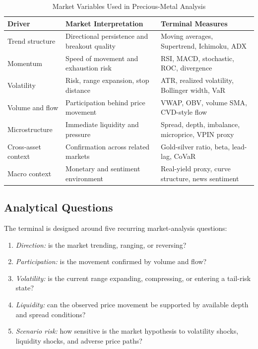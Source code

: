 \documentclass[conference]{IEEEtran}
\begin{document}
\begin{table}[!t]
\caption{Market Variables Used in Precious-Metal Analysis}
\label{tab:market-drivers}
\centering
\begin{tabular}{@{}p{}p{}p{}@{}}
\toprule
\textbf{Driver} & \textbf{Market Interpretation} & \textbf{Terminal Measures} \\
\midrule
Trend structure & Directional persistence and breakout quality &
Moving averages, Supertrend, Ichimoku, ADX \\
Momentum & Speed of movement and exhaustion risk &
RSI, MACD, stochastic, ROC, divergence \\
Volatility & Risk, range expansion, stop distance &
ATR, realized volatility, Bollinger width, VaR \\
Volume and flow & Participation behind price movement &
VWAP, OBV, volume SMA, CVD-style flow \\
Microstructure & Immediate liquidity and pressure &
Spread, depth, imbalance, microprice, VPIN proxy \\
Cross-asset context & Confirmation across related markets &
Gold-silver ratio, beta, lead-lag, CoVaR \\
Macro context & Monetary and sentiment environment &
Real-yield proxy, curve structure, news sentiment \\
\bottomrule
\end{tabular}
\end{table}

\subsection{Analytical Questions}

The terminal is designed around five recurring market-analysis questions:
\begin{enumerate}
  \item \textit{Direction:} is the market trending, ranging, or reversing?
  \item \textit{Participation:} is the movement confirmed by volume and flow?
  \item \textit{Volatility:} is the current range expanding, compressing, or
  entering a tail-risk state?
  \item \textit{Liquidity:} can the observed price movement be supported by
  available depth and spread conditions?
  \item \textit{Scenario risk:} how sensitive is the market hypothesis to
  volatility shocks, liquidity shocks, and adverse price paths?
\end{enumerate}
\end{document}
